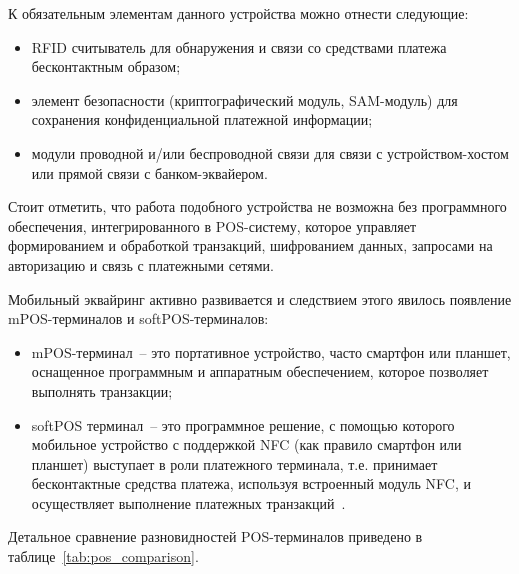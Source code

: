 К обязательным элементам данного устройства можно отнести следующие:

\begin{itemize}
    \item RFID считыватель для обнаружения и связи со средствами платежа бесконтактным образом;
    \item элемент безопасности (криптографический модуль, SAM-модуль) для сохранения конфиденциальной платежной информации;
    \item модули проводной и/или беспроводной связи для связи с устройством-хостом или прямой связи с банком-эквайером.
\end{itemize}

Стоит отметить, что работа подобного устройства не возможна без программного обеспечения, интегрированного в POS-систему, которое управляет формированием и обработкой транзакций, шифрованием данных, запросами на авторизацию и связь с платежными сетями.

Мобильный эквайринг активно развивается и следствием этого явилось появление mPOS-терминалов и softPOS-терминалов:

\begin{itemize}
    \item mPOS-терминал~-- это портативное устройство, часто смартфон или планшет, оснащенное программным и аппаратным обеспечением, которое позволяет выполнять транзакции;
    \item softPOS терминал~-- это программное решение, с помощью которого мобильное устройство с поддержкой NFC (как правило смартфон или планшет) выступает в роли платежного терминала, т.е. принимает бесконтактные средства платежа, используя встроенный модуль NFC, и осуществляет выполнение платежных транзакций~\cite{pos_term}.
\end{itemize}

Детальное сравнение разновидностей POS-терминалов приведено в таблице~\ref{tab:pos_comparison}.

